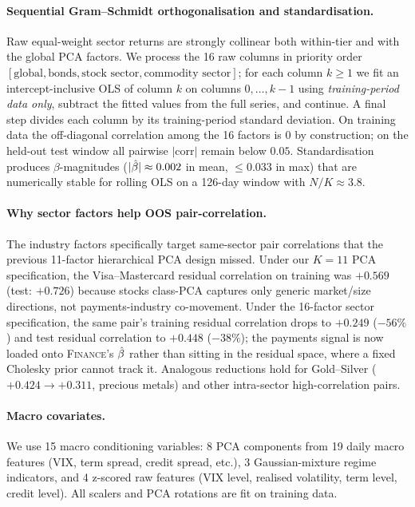 \paragraph{Sequential Gram--Schmidt orthogonalisation and standardisation.}
Raw equal-weight sector returns are strongly collinear both within-tier and with the global PCA factors. We process the 16 raw columns in priority order $[\text{global}, \text{bonds}, \text{stock sector}, \text{commodity sector}]$; for each column $k \ge 1$ we fit an intercept-inclusive OLS of column $k$ on columns $0,\ldots,k-1$ using \emph{training-period data only}, subtract the fitted values from the full series, and continue. A final step divides each column by its training-period standard deviation. On training data the off-diagonal correlation among the 16 factors is $0$ by construction; on the held-out test window all pairwise $|\text{corr}|$ remain below $0.05$. Standardisation produces $\beta$-magnitudes ($|\hat{\beta}| \approx 0.002$ in mean, $\le 0.033$ in max) that are numerically stable for rolling OLS on a 126-day window with $N/K \approx 3.8$.

\paragraph{Why sector factors help OOS pair-correlation.}
The industry factors specifically target same-sector pair correlations that the previous 11-factor hierarchical PCA design missed. Under our $K=11$ PCA specification, the Visa--Mastercard residual correlation on training was $+0.569$ (test: $+0.726$) because stocks class-PCA captures only generic market/size directions, not payments-industry co-movement. Under the 16-factor sector specification, the same pair's training residual correlation drops to $+0.249$ ($-56\%$) and test residual correlation to $+0.448$ ($-38\%$); the payments signal is now loaded onto \textsc{Finance}'s $\hat{\beta}$ rather than sitting in the residual space, where a fixed Cholesky prior cannot track it. Analogous reductions hold for Gold--Silver ($+0.424 \to +0.311$, precious metals) and other intra-sector high-correlation pairs.

\paragraph{Macro covariates.}
We use 15 macro conditioning variables: 8 PCA components from 19 daily macro features (VIX, term spread, credit spread, etc.), 3 Gaussian-mixture regime indicators, and 4 z-scored raw features (VIX level, realised volatility, term level, credit level). All scalers and PCA rotations are fit on training data.

